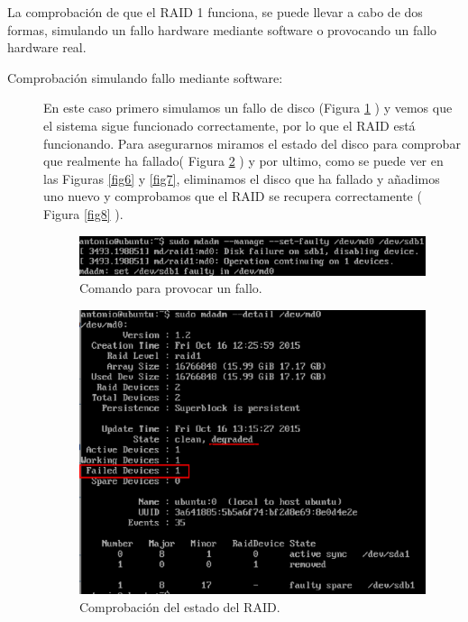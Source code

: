 La comprobación de que el RAID 1 funciona, se puede llevar a cabo de dos formas, simulando un fallo hardware mediante software o provocando un fallo hardware real.

\begin{description}
    \item[Comprobación simulando fallo mediante software:\cite{pruebaraid}] 
    
 En este caso primero simulamos un fallo de disco (Figura \ref{fig4} ) y vemos que el sistema  sigue funcionado correctamente, por lo que el RAID  está funcionando. Para asegurarnos miramos el estado del disco para comprobar que realmente ha fallado( Figura \ref{fig5} ) y por ultimo, como se puede ver en las Figuras \ref{fig6} y \ref{fig7}, eliminamos el disco que ha fallado y añadimos uno nuevo y comprobamos que el RAID se recupera correctamente ( Figura \ref{fig8} ).

                \begin{figure}[H]
                    \begin{center}
                        \includegraphics[scale=0.6]{Imagenes/fallo.eps}
                        \caption{Comando para provocar un fallo.}
                        \label{fig4}
                    \end{center}
                \end{figure}

            \begin{figure}[H]
                \begin{center}
                    \includegraphics[scale=0.5]{Imagenes/estado_fallo.eps}
                    \caption{Comprobación del estado del RAID.}
                    \label{fig5}
                \end{center}
            \end{figure}


\end{description}
